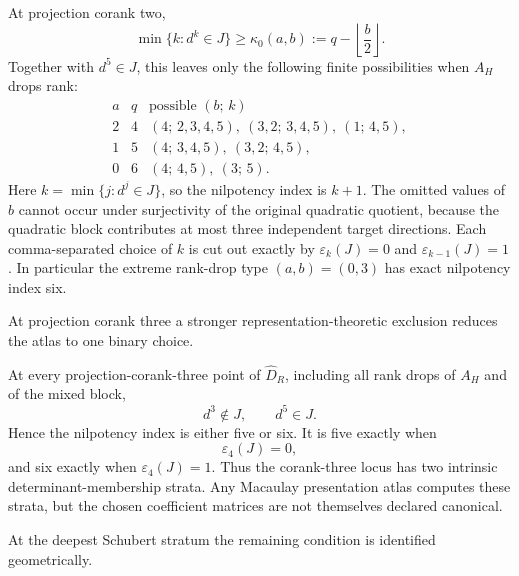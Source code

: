 \begin{proposition}
\label{prop:rankdrop-coranktwo-depth}
At projection corank two,
\begin{equation}\label{eq:coranktwo-lower-bound}
 \min\{k:d^k\in J\}\ge
 \kappa_0(a,b):=
 q-\left\lfloor\frac b2\right\rfloor.
\end{equation}
Together with \(d^5\in J\), this leaves only the following finite
possibilities when \(A_H\) drops rank:
\[
\begin{array}{c|c|c}
a&q&\text{possible }(b;\,k)\\ \hline
2&4&(4;\,2,3,4,5),\ (3,2;\,3,4,5),\ (1;\,4,5),\\
1&5&(4;\,3,4,5),\ (3,2;\,4,5),\\
0&6&(4;\,4,5),\ (3;\,5).
\end{array}
\]
Here \(k=\min\{j:d^j\in J\}\), so the nilpotency index is \(k+1\).
The omitted values of \(b\) cannot occur under surjectivity of the
original quadratic quotient, because the quadratic block contributes
at most three independent target directions.
Each comma-separated choice of \(k\) is cut out exactly by
\(\varepsilon_k(J)=0\) and
\(\varepsilon_{k-1}(J)=1\).
In particular the extreme rank-drop type \((a,b)=(0,3)\) has exact
nilpotency index six.
\end{proposition}

At projection corank three a stronger representation-theoretic
exclusion reduces the atlas to one binary choice.

\begin{theorem}
\label{thm:corank-three-depth}
At every projection-corank-three point of \(\widehat D_R\),
including all rank drops of \(A_H\) and of the mixed block,
\begin{equation}\label{eq:corank3-no-d3}
 d^3\notin J,\qquad d^5\in J.
\end{equation}
Hence the nilpotency index is either five or six.  It is five exactly
when
\[
 \varepsilon_4(J)=0,
\]
and six exactly when \(\varepsilon_4(J)=1\).
Thus the corank-three locus has two intrinsic determinant-membership
strata.  Any Macaulay presentation atlas computes these strata, but
the chosen coefficient matrices are not themselves declared
canonical.
\end{theorem}

At the deepest Schubert stratum the remaining condition is identified
geometrically.

